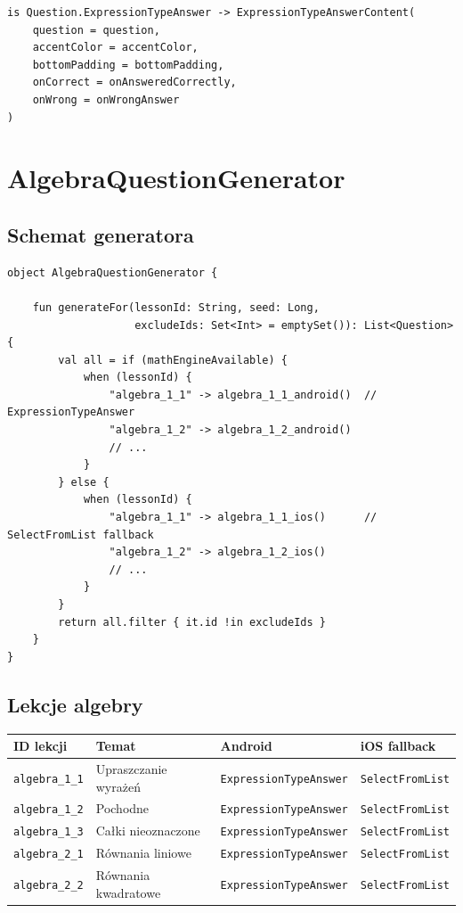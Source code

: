 \documentclass[11pt,a4paper]{article}
\begin{document}
\begin{lstlisting}
is Question.ExpressionTypeAnswer -> ExpressionTypeAnswerContent(
    question = question,
    accentColor = accentColor,
    bottomPadding = bottomPadding,
    onCorrect = onAnsweredCorrectly,
    onWrong = onWrongAnswer
)
\end{lstlisting}

\section{AlgebraQuestionGenerator}

\subsection{Schemat generatora}

\begin{lstlisting}
object AlgebraQuestionGenerator {

    fun generateFor(lessonId: String, seed: Long,
                    excludeIds: Set<Int> = emptySet()): List<Question> {
        val all = if (mathEngineAvailable) {
            when (lessonId) {
                "algebra_1_1" -> algebra_1_1_android()  // ExpressionTypeAnswer
                "algebra_1_2" -> algebra_1_2_android()
                // ...
            }
        } else {
            when (lessonId) {
                "algebra_1_1" -> algebra_1_1_ios()      // SelectFromList fallback
                "algebra_1_2" -> algebra_1_2_ios()
                // ...
            }
        }
        return all.filter { it.id !in excludeIds }
    }
}
\end{lstlisting}

\subsection{Lekcje algebry}

\begin{center}
\begin{tabular}{llll}
\toprule
\textbf{ID lekcji} & \textbf{Temat} & \textbf{Android} & \textbf{iOS fallback} \\
\midrule
\texttt{algebra\_1\_1} & Upraszczanie wyrażeń & \texttt{ExpressionTypeAnswer} & \texttt{SelectFromList} \\
\texttt{algebra\_1\_2} & Pochodne & \texttt{ExpressionTypeAnswer} & \texttt{SelectFromList} \\
\texttt{algebra\_1\_3} & Całki nieoznaczone & \texttt{ExpressionTypeAnswer} & \texttt{SelectFromList} \\
\texttt{algebra\_2\_1} & Równania liniowe & \texttt{ExpressionTypeAnswer} & \texttt{SelectFromList} \\
\texttt{algebra\_2\_2} & Równania kwadratowe & \texttt{ExpressionTypeAnswer} & \texttt{SelectFromList} \\
\bottomrule
\end{tabular}
\end{center}
\end{document}
